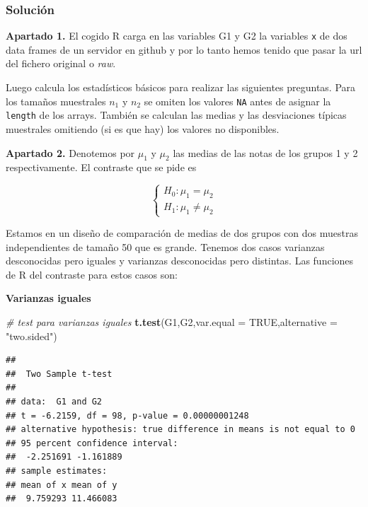 \documentclass[
]{article}
\newenvironment{Shaded}{\begin{snugshade}}{\end{snugshade}}
\newcommand{\CommentTok}[1]{\textcolor[rgb]{0.56,0.35,0.01}{\textit{#1}}}
\newcommand{\DataTypeTok}[1]{\textcolor[rgb]{0.13,0.29,0.53}{#1}}
\newcommand{\KeywordTok}[1]{\textcolor[rgb]{0.13,0.29,0.53}{\textbf{#1}}}
\newcommand{\NormalTok}[1]{#1}
\newcommand{\OtherTok}[1]{\textcolor[rgb]{0.56,0.35,0.01}{#1}}
\newcommand{\StringTok}[1]{\textcolor[rgb]{0.31,0.60,0.02}{#1}}
\begin{document}
\hypertarget{soluciuxf3n}{%
\subsubsection{Solución}\label{soluciuxf3n}}

\textbf{Apartado 1.} El cogido R carga en las variables G1 y G2 la
variables \texttt{x} de dos data frames de un servidor en github y por
lo tanto hemos tenido que pasar la url del fichero original o
\emph{raw}.

Luego calcula los estadísticos básicos para realizar las siguientes
preguntas. Para los tamaños muestrales \(n_1\) y \(n_2\) se omiten los
valores \texttt{NA} antes de asignar la \texttt{length} de los arrays.
También se calculan las medias y las desviaciones típicas muestrales
omitiendo (si es que hay) los valores no disponibles.

\textbf{Apartado 2.} Denotemos por \(\mu_1\) y \(\mu_2\) las medias de
las notas de los grupos 1 y 2 respectivamente. El contraste que se pide
es

\[
\left\{\begin{array}{ll}
H_0:\mu_{1} = \mu_{2}\\
H_1: \mu_{1} \not= \mu_{2}
\end{array}\right.
\]

Estamos en un diseño de comparación de medias de dos grupos con dos
muestras independientes de tamaño 50 que es grande. Tenemos dos casos
varianzas desconocidas pero iguales y varianzas desconocidas pero
distintas. Las funciones de R del contraste para estos casos son:

\textbf{Varianzas iguales}

\begin{Shaded}
\begin{Highlighting}[]
\CommentTok{\# test para varianzas iguales}
\KeywordTok{t.test}\NormalTok{(G1,G2,}\DataTypeTok{var.equal =} \OtherTok{TRUE}\NormalTok{,}\DataTypeTok{alternative =} \StringTok{"two.sided"}\NormalTok{)}
\end{Highlighting}
\end{Shaded}

\begin{verbatim}
## 
##  Two Sample t-test
## 
## data:  G1 and G2
## t = -6.2159, df = 98, p-value = 0.00000001248
## alternative hypothesis: true difference in means is not equal to 0
## 95 percent confidence interval:
##  -2.251691 -1.161889
## sample estimates:
## mean of x mean of y 
##  9.759293 11.466083
\end{verbatim}
\end{document}
